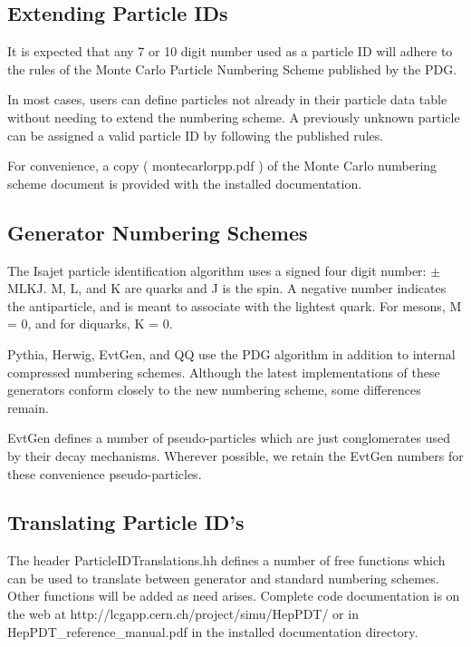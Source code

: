\subsection { Extending Particle IDs }
\label{pid}

It is expected that any 7 or 10 digit number used as a particle ID will 
adhere to the rules of the Monte Carlo Particle Numbering Scheme 
published by the PDG.\cite{pdg}

In most cases, users can define particles not already in their
particle data table without needing to extend the numbering scheme.
A previously unknown particle can be assigned a valid particle ID by
following the published rules.\cite{scheme}

For convenience, a copy ( montecarlorpp.pdf ) of the Monte Carlo numbering 
scheme document is provided with the installed documentation.

\subsection { Generator Numbering Schemes }

The Isajet particle identification algorithm uses a signed four digit
number: $\pm$MLKJ.  M, L, and K are quarks and J is the spin.  A negative
number indicates the antiparticle, and is meant to associate with the
lightest quark.  For mesons, M = 0, and for diquarks, K = 0.

Pythia, Herwig, EvtGen, and QQ use the PDG algorithm in addition to internal
compressed numbering schemes.
Although the latest implementations of these generators conform closely
to the new numbering scheme, some differences remain.

EvtGen defines a number of pseudo-particles which are just 
conglomerates used by their decay mechanisms.  
Wherever possible, we retain the 
EvtGen numbers for these convenience pseudo-particles.

\subsection { Translating Particle ID's }

The header ParticleIDTranslations.hh defines a number of free functions 
which can be used to translate between generator and standard numbering schemes.
Other functions will be added as need arises.  
Complete code documentation is
on the web at http://lcgapp.cern.ch/project/simu/HepPDT/
or in HepPDT\_reference\_manual.pdf in the installed documentation directory. 


